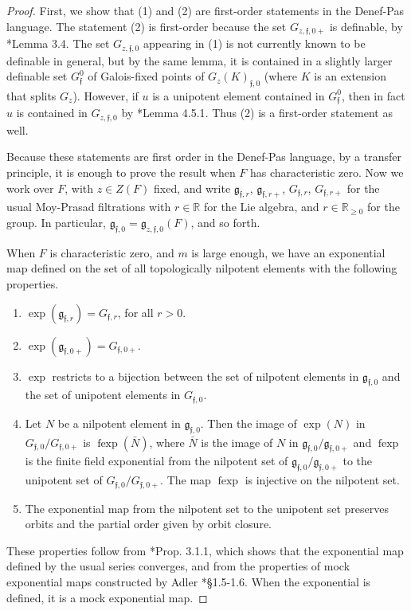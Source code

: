 \documentclass[12pt]{amsart}
\newcommand{\op}[1]{\operatorname{#1}}
\newcommand{\ring}[1]{{\mathbb #1}}
\def\s{{\mathfrak{f}}}
\newcommand{\fg}{\mathfrak{g}}
\theoremstyle{plain}
\theoremstyle{definition}
\begin{document}
\begin{proof} First, we show that (1) and (2) are first-order
  statements in the Denef-Pas language.  The statement (2) is
  first-order because the set $G_{z,\s,0+}$ is definable, by
  \cite{CGH2}*{Lemma 3.4}. The set $G_{z,\s,0}$ appearing in (1) is
  not currently known to be definable in general, but by the same
  lemma, it is contained in a slightly larger definable set $G_\s^0$
  of Galois-fixed points of $G_z(K)_{\s, 0}$ (where $K$ is an
  extension that splits $G_z$).  However, if $u$ is a unipotent
  element contained in $G_\s^0$, then in fact $u$ is contained in
  $G_{z, \s, 0}$ by \cite{debacker:nilp}*{Lemma 4.5.1}.  Thus (2) is a
  first-order statement as well.
   
  Because these statements are first order in the Denef-Pas language,
  by a transfer principle, it is enough to prove the result when $F$
  has characteristic zero.  Now we work over $F$, with $z\in Z(F)$
  fixed, and write $\fg_{\s,r}$, $\fg_{\s,r+}$, $G_{\s,r}$,
  $G_{\s,r+}$ for the usual Moy-Prasad filtrations with $r\in\ring{R}$
  for the Lie algebra, and $r\in \ring{R}_{\ge 0}$ for the group.  In
  particular, $\fg_{\s,0}=\fg_{z,\s,0}(F)$, and so forth.

  When $F$ is characteristic zero, and $m$ is large enough, we have an
  exponential map defined on the set of all topologically nilpotent
  elements with the following properties.
  \begin{enumerate}
    \item $\exp(\fg_{\s,r}) = G_{\s,r}$, for all $r>0$.
    \item $\exp(\fg_{\s,0+}) = G_{\s,0+}$.
    \item $\exp$ restricts to a bijection between the set of
      nilpotent elements in $\fg_{\s,0}$ and the set of unipotent
      elements in $G_{\s,0}$.
   \item Let $N$ be a nilpotent element in $\fg_{\s,0}$.  Then the
     image of $\exp(N)$ in $G_{\s,0}/G_{\s,0+}$ is $\op{fexp}(\bar N)$,
     where $\bar N$ is the image of $N$ in $\fg_{\s,0}/\fg_{\s,0+}$ and
     $\op{fexp}$ is the finite field exponential from the nilpotent
     set of $\fg_{\s,0}/\fg_{\s,0+}$ to the unipotent set of
     $G_{\s,0}/G_{\s,0+}$. The map $\op{fexp}$ is injective on the
     nilpotent set.
   \item The exponential map from the nilpotent set to the unipotent
     set preserves orbits and the partial order given by orbit closure.
 \end{enumerate}
 These properties follow from \cite{kim:hecke}*{Prop. 3.1.1}, which
 shows that the exponential map defined by the usual series converges,
 and from the properties of mock exponential maps constructed by
 Adler \cite{adler:anisotropic}*{\S 1.5-1.6}.  When the exponential
 is defined, it is a mock exponential map.
   

\end{proof}
\end{document}
